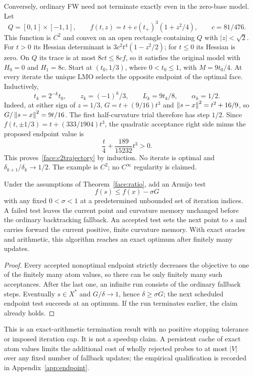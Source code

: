 Conversely, ordinary FW need not terminate exactly even in the
zero-base model. Let
\begin{equation}\label{face:c2example}
 Q=[0,1]\times[-1,1],\qquad
 f(t,z)=t+c(t_+)^3(1+z^2/4),\qquad c=81/476.
\end{equation}
This function is $C^2$ and convex on an open rectangle containing
$Q$ with $|z|<\sqrt2$. For $t>0$ its Hessian determinant is
$3c^2t^4(1-z^2/2)$; for $t\le0$ its Hessian is zero. On $Q$ its
trace is at most $8ct\le8cf$, so it satisfies the original model
with $H_0=0$ and $H_1=8c$.
Start at $(t_0,1/3)$, where $0<t_0\le1$, with $M=9t_0/4$.
At every iterate the unique LMO selects the opposite endpoint of the
optimal face. Inductively,
\begin{equation}\label{face:c2trajectory}
 t_k=2^{-k}t_0,\qquad z_k=(-1)^k/3,\qquad
 L_k=9t_k/8,\qquad \alpha_k=1/2.
\end{equation}
Indeed, at either sign of $z=1/3$,
$G=t+(9/16)t^3$ and $\left\|s-x\right\|^2=t^2+16/9$, so
$G/\left\|s-x\right\|^2=9t/16$. The first half-curvature trial therefore
has step $1/2$. Since
$f(t,\pm1/3)=t+(333/1904)t^3$, the quadratic acceptance right
side minus the proposed endpoint value is
\[
 \frac{t}{4}+\frac{189}{15232}t^3>0.
\]
This proves~\eqref{face:c2trajectory} by induction. No iterate is
optimal and $\delta_{k+1}/\delta_k\to1/2$. The example is $C^2$;
no $C^\infty$ regularity is claimed.

\begin{corollary}
\label{face:endpoint}
Under the assumptions of Theorem~\ref{face:ratio}, add an
Armijo test
\begin{equation}\label{face:armijo}
 f(s)\le f(x)-\sigma G
\end{equation}
with any fixed $0<\sigma<1$ at a predetermined unbounded set of
iteration indices. A failed test leaves the current point and curvature memory unchanged
before the ordinary backtracking fallback. An accepted test sets the
next point to $s$ and carries forward the current positive, finite
curvature memory. With exact oracles and arithmetic, this algorithm
reaches an exact optimum after finitely many updates.
\end{corollary}
\begin{proof}
Every accepted nonoptimal endpoint strictly decreases the objective
to one of the finitely many atom values, so there can be only finitely
many such acceptances. After the last one, an infinite run consists
of the ordinary fallback steps. Eventually $s\in X^*$ and
$G/\delta\to1$, hence $\delta\ge\sigma G$; the next scheduled
endpoint test succeeds at an optimum. If the run terminates earlier,
the claim already holds.
\end{proof}
This is an exact-arithmetic termination result with no positive
stopping tolerance or imposed iteration cap. It is not a speedup
claim. A persistent cache of exact atom values limits the additional
cost of wholly rejected probes to at most $|V|$ over any fixed number
of fallback updates; the empirical qualification is recorded in
Appendix~\ref{app:endpoint}.
